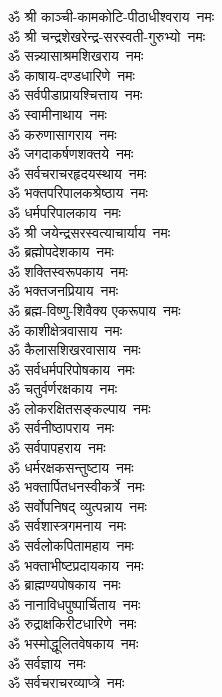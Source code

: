 \begin{flushleft}
\begin{multicols}{2}
ॐ श्री काञ्ची-कामकोटि-पीठाधीश्वराय~नमः\\
ॐ श्री चन्द्रशेखरेन्द्र-सरस्वती-गुरुभ्यो~नमः\\
ॐ सन्न्यासाश्रमशिखराय~नमः\\
ॐ काषाय-दण्डधारिणे~नमः\\
ॐ सर्वपीडाप्रायश्चित्ताय~नमः\\
ॐ स्वामीनाथाय~नमः\\
ॐ करुणासागराय~नमः\\
ॐ जगदाकर्षणशक्तये~नमः\\
ॐ सर्वचराचरहृदयस्थाय~नमः\\
ॐ भक्तपरिपालकश्रेष्ठाय~नमः\hfill{}\\
ॐ धर्मपरिपालकाय~नमः\\
ॐ श्री जयेन्द्रसरस्वत्याचार्याय~नमः\\
ॐ ब्रह्मोपदेशकाय~नमः\\
ॐ शक्तिस्वरूपकाय~नमः\\
ॐ भक्तजनप्रियाय~नमः\\
ॐ ब्रह्म-विष्णु-शिवैक्य एकरूपाय~नमः\\
ॐ काशीक्षेत्रवासाय~नमः\\
ॐ कैलासशिखरवासाय~नमः\\
ॐ सर्वधर्मपरिपोषकाय~नमः\\
ॐ चतुर्वर्णरक्षकाय~नमः\hfill{}\\
ॐ लोकरक्षितसङ्कल्पाय~नमः\\
ॐ सर्वनीष्ठापराय~नमः\\
ॐ सर्वपापहराय~नमः\\
ॐ धर्मरक्षकसन्तुष्टाय~नमः\\
ॐ भक्तार्पितधनस्वीकर्त्रे~नमः\\
ॐ सर्वोपनिषद् व्युत्पन्नाय~नमः\\
ॐ सर्वशास्त्रगमनाय~नमः\\
ॐ सर्वलोकपितामहाय~नमः\\
ॐ भक्ताभीष्टप्रदायकाय~नमः\\
ॐ ब्राह्मण्यपोषकाय~नमः\hfill{}\\
ॐ नानाविधपुष्पार्चिताय~नमः\\
ॐ रुद्राक्षकिरीटधारिणे~नमः\\
ॐ भस्मोद्धूलितवेषकाय~नमः\\
ॐ सर्वज्ञाय~नमः\\
ॐ सर्वचराचरव्याप्त्रे~नमः\\

\end{multicols}
\end{flushleft}
